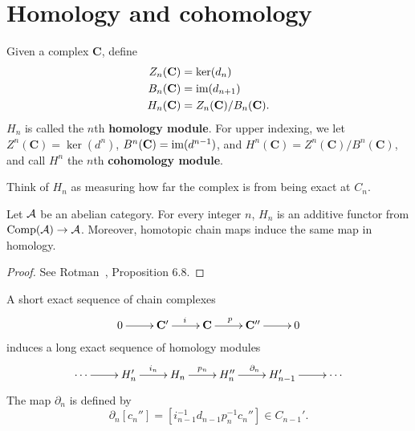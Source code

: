\section{Homology and cohomology}
\begin{df}
Given a complex $\mathbf{C}$, define
\begin{align*}
Z_n(\mathbf C)&=\ker(d_n)\\
B_n(\mathbf C)&=\im(d_{n+1})\\
H_n(\mathbf C)&=Z_n(\mathbf C)/B_n(\mathbf C).
\end{align*}
$H_n$ is called the $n$th \textbf{homology module}. For upper indexing, we let $Z^n(\mathbf C)=\ker(d^n)$, $B^n(\mathbf C)=\im(d^{n-1})$, and $H^n(\mathbf C)=Z^n(\mathbf C)/B^n(\mathbf C)$, and call $H^n$ the $n$th \textbf{cohomology module}.
\end{df}
Think of $H_n$ as measuring how far the complex is from being exact at $C_n$.
\begin{thm}
Let $\cal A$ be an abelian category. For every integer $n$, 
$H_n$ is an additive functor from $\Comp(\cal A)\to \cal A$. Moreover, homotopic chain maps induce the same map in homology.
\end{thm}
\begin{proof}
See Rotman~\cite{Ro09}, Proposition 6.8.
\end{proof}
\begin{thm}
A short exact sequence of chain complexes
\[
\xymatrix{0\ar[r]&\mathbf C'\ar[r]^{i}& \mathbf C\ar[r]^p& \mathbf C''\ar[r]&0}
\]
induces a long exact sequence of homology modules
\[
\xymatrix{\cdots \ar[r]&
H_{n}'\ar[r]^{i_n} & H_n\ar[r]^{p_n} & H_n'' \ar[r]^{\partial_n}& H_{n-1}'\ar[r]&\cdots%
}
\]
The map $\partial_n$ 
is defined by
\[
\partial_n[c_n'']=[i_{n-1}^{-1}d_{n-1}p_n^{-1}c_n'']\in C_{n-1}'.
\]
\end{thm}
